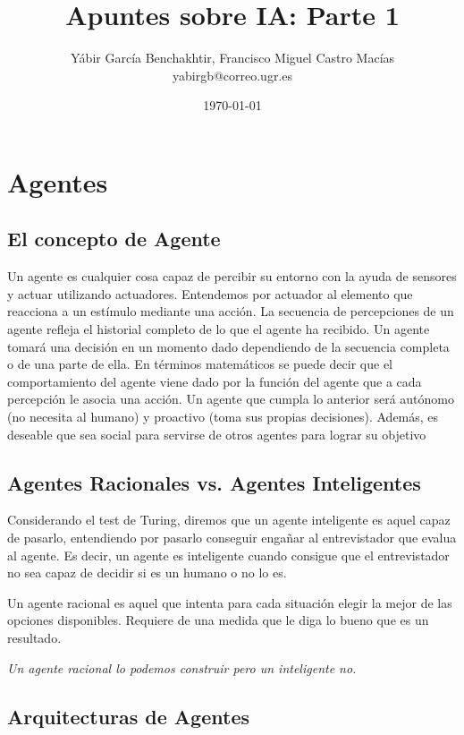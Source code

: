 \documentclass[12pt]{article}
\author{Yábir García Benchakhtir, Francisco Miguel Castro Macías\\yabirgb@correo.ugr.es}
\date{\today}
\title{Apuntes sobre IA: Parte 1}
\begin{document}
\setlength{\parindent}{0cm}
\setlength{\parskip}{3mm}

\maketitle

\section{Agentes}

\subsection{El concepto de Agente}

Un agente es cualquier cosa capaz de percibir su entorno con la ayuda
de sensores y actuar utilizando actuadores. Entendemos por actuador al
elemento que reacciona a un estímulo mediante una acción.  La
secuencia de percepciones de un agente refleja el historial completo
de lo que el agente ha recibido. Un agente tomará una decisión en un
momento dado dependiendo de la secuencia completa o de una parte de
ella. En términos matemáticos se puede decir que el comportamiento del
agente viene dado por la función del agente que a cada percepción le
asocia una acción.  Un agente que cumpla lo anterior será autónomo (no
necesita al humano) y proactivo (toma sus propias decisiones). Además,
es deseable que sea social para servirse de otros agentes para lograr
su objetivo

\subsection{Agentes Racionales vs. Agentes Inteligentes}

Considerando el test de Turing, diremos que un agente inteligente es
aquel capaz de pasarlo, entendiendo por pasarlo conseguir engañar al
entrevistador que evalua al agente. Es decir, un agente es inteligente
cuando consigue que el entrevistador no sea capaz de decidir si es un
humano o no lo es.

Un agente racional es aquel que intenta para cada situación elegir la
mejor de las opciones disponibles. Requiere de una medida que le diga
lo bueno que es un resultado.

\textit{Un agente racional lo podemos construir pero un inteligente no.}

\subsection{Arquitecturas de Agentes}
\end{document}
